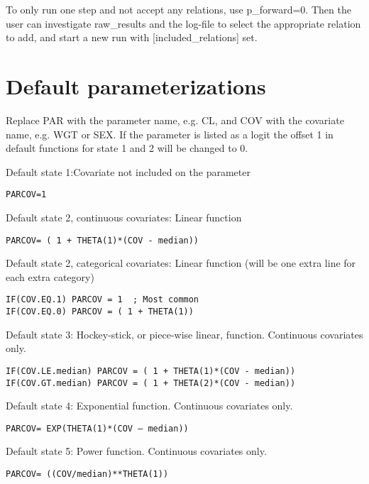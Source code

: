 \documentclass[a4paper,12pt]{article}
\begin{document}
To only run one step and not accept any relations, use p\_forward=0. Then the user can investigate raw\_results and the log-file to select the appropriate relation to add, and start a new run with [included\_relations] set.

\section{Default parameterizations}
Replace PAR with the parameter name, e.g. CL, and COV with the covariate name, e.g. WGT or SEX.
If the parameter is listed as a logit the offset 1 in default functions for state 1 and 2 will be changed to 0.

Default state 1:Covariate not included on the parameter
\begin{verbatim}
PARCOV=1
\end{verbatim}

Default state 2, continuous covariates: Linear function
\begin{verbatim}
PARCOV= ( 1 + THETA(1)*(COV - median))
\end{verbatim}

Default state 2, categorical covariates: Linear function (will be one extra line for each extra category)
\begin{verbatim}
IF(COV.EQ.1) PARCOV = 1  ; Most common
IF(COV.EQ.0) PARCOV = ( 1 + THETA(1))
\end{verbatim}

Default state 3: Hockey-stick, or piece-wise linear, function. Continuous covariates only.
\begin{verbatim}
IF(COV.LE.median) PARCOV = ( 1 + THETA(1)*(COV - median))
IF(COV.GT.median) PARCOV = ( 1 + THETA(2)*(COV - median))
\end{verbatim}

Default state 4: Exponential function. Continuous covariates only.
\begin{verbatim}
PARCOV= EXP(THETA(1)*(COV – median))
\end{verbatim}

Default state 5: Power function. Continuous covariates only.
\begin{verbatim}
PARCOV= ((COV/median)**THETA(1))
\end{verbatim}
\end{document}
